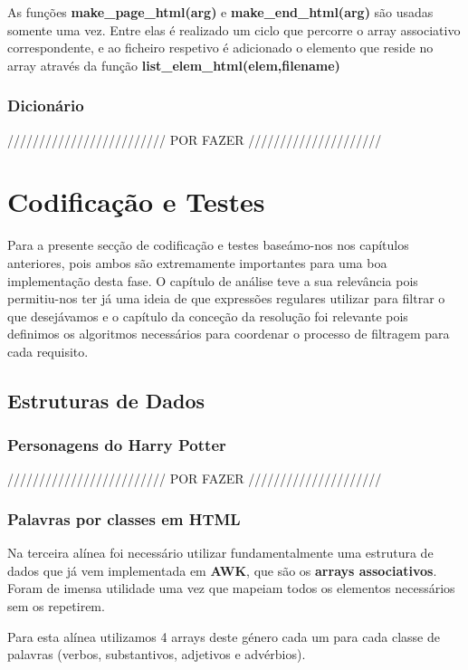 \documentclass[11pt,a4paper]{report}
\begin{document}
As funções \textbf{make\_page\_html(arg)} e \textbf{make\_end\_html(arg)} são usadas somente uma vez. Entre elas é realizado um ciclo que percorre o array associativo correspondente, e ao ficheiro respetivo é adicionado o elemento que reside no array através da função \textbf{list\_elem\_html(elem,filename)}


\subsection{Dicionário}
\label{sub:algoritmos4}

///////////////////////// POR FAZER /////////////////////


\chapter{Codificação e Testes}
\label{chap:codificacao}

Para a presente secção de codificação e testes baseámo-nos nos capítulos anteriores, pois ambos são extremamente importantes para uma boa implementação desta fase. O capítulo de análise teve a sua relevância pois permitiu-nos ter já uma ideia de que expressões regulares utilizar para filtrar o que desejávamos e o capítulo da conceção da resolução foi relevante pois definimos os algoritmos necessários para coordenar o processo de filtragem para cada requisito.

\section{Estruturas de Dados}

\subsection{Personagens do Harry Potter}
///////////////////////// POR FAZER /////////////////////

\subsection{Palavras por classes em HTML}

Na terceira alínea foi necessário utilizar fundamentalmente uma estrutura de dados que já vem implementada em \textbf{AWK}, que são os \textbf{arrays associativos}. Foram de imensa utilidade uma vez que mapeiam todos os elementos necessários sem os repetirem.

Para esta alínea utilizamos 4 arrays deste género cada um para cada classe de palavras (verbos, substantivos, adjetivos e advérbios).
\end{document}
